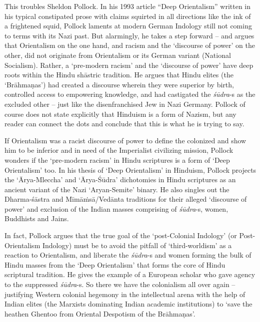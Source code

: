 This troubles Sheldon Pollock. In his 1993 article “Deep Orientalism” written in his typical constipated prose with claims squirted in all directions like the ink of a frightened squid, Pollock laments at modern German Indology still not coming to terms with its Nazi past. But alarmingly, he takes a step forward – and argues that Orientalism on the one hand, and racism and the ‘discourse of power’ on the other, did not originate from Orientalism or its German variant (National Socialism). Rather, a ‘pre-modern racism’ and the ‘discourse of power’ have deep roots within the Hindu shāstric tradition. He argues that Hindu elites (the ‘Brāhmaṇas’) had created a discourse wherein they were superior by birth, controlled access to empowering knowledge, and had castigated the \textit{śūdra}-s as the excluded other – just like the disenfranchised Jew in Nazi Germany. Pollock of course does not state explicitly that Hinduism is a form of Nazism, but any reader can connect the dots and conclude that this is what he is trying to say.

If Orientalism was a racist discourse of power to define the colonized and show him to be inferior and in need of the Imperialist civilizing mission, Pollock wonders if the ‘pre-modern racism’ in Hindu scriptures is a form of ‘Deep Orientalism’ too. In his thesis of ‘Deep Orientalism’ in Hinduism, Pollock projects the ‘Ārya-Mleccha’ and ‘Ārya-Śūdra’ dichotomies in Hindu scriptures as an ancient variant of the Nazi ‘Aryan-Semite’ binary. He also singles out the Dharma-śāstra and Mīmāṁsā/Vedānta traditions for their alleged ‘discourse of power’ and exclusion of the Indian masses comprising of \textit{śūdra}-s, women, Buddhists and Jains.

In fact, Pollock argues that the true goal of the ‘post-Colonial Indology’ (or Post-Orientalism Indology) must be to avoid the pitfall of ‘third-worldism’ as a reaction to Orientalism, and liberate the \textit{śūdra}-s and women forming the bulk of Hindu masses from the ‘Deep Orientalism’ that forms the core of Hindu scriptural tradition. He gives the example of a European scholar who gave agency to the suppressed \textit{śūdra}-s. So there we have the colonialism all over again – justifying Western colonial hegemony in the intellectual arena with the help of Indian elites (the Marxists dominating Indian academic institutions) to ‘save the heathen Ghentoo from Oriental Despotism of the Brāhmaṇas’.

